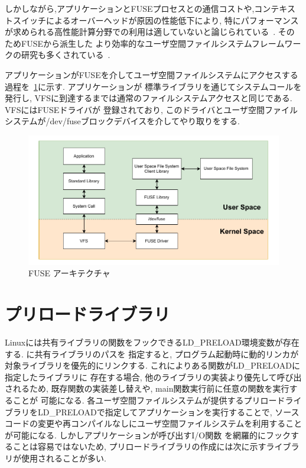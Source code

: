 \documentclass[a4paper,11pt]{jreport}
\begin{document}
しかしながら,アプリケーションとFUSEプロセスとの通信コストや,コンテキストスイッチによるオーバーヘッドが原因の性能低下により, 
特にパフォーマンスが求められる高性能計算分野での利用は適していないと論じられている~\cite{brinkmann2020ad}. そのためFUSEから派生した
より効率的なユーザ空間ファイルシステムフレームワークの研究も多くされている~\cite{294791, zhu2018direct}. 

アプリケーションがFUSEを介してユーザ空間ファイルシステムにアクセスする過程を\figurename~\ref{fig:FUSE}に示す. アプリケーションが
標準ライブラリを通じてシステムコールを発行し, VFSに到達するまでは通常のファイルシステムアクセスと同じである. VFSにはFUSEドライバが
登録されており, このドライバとユーザ空間ファイルシステムが/dev/fuseブロックデバイスを介してやり取りをする.


\newpage


\begin{figure}[h]
	\begin{minipage}[b]{1\columnwidth}
		\centering
		\includegraphics[width=0.9\linewidth]{./figure/FUSE.pdf}
		\caption{FUSE アーキテクチャ}
		\label{fig:FUSE}
	\end{minipage}
\end{figure}

\newpage


\section{プリロードライブラリ}
Linuxには共有ライブラリの関数をフックできるLD\_PRELOAD環境変数が存在する. に共有ライブラリのパスを
指定すると, プログラム起動時に動的リンカが対象ライブラリを優先的にリンクする. これによりある関数がLD\_PRELOADに指定したライブラリに
存在する場合, 他のライブラリの実装より優先して呼び出されるため, 既存関数の実装差し替えや, main関数実行前に任意の関数を実行することが
可能になる. 各ユーザ空間ファイルシステムが提供するプリロードライブラリをLD\_PRELOADで指定してアプリケーションを実行することで, 
ソースコードの変更や再コンパイルなしにユーザ空間ファイルシステムを利用することが可能になる. しかしアプリケーションが呼び出すI/O関数
を網羅的にフックすることは容易ではないため, プリロードライブラリの作成には次に示すライブラリが使用されることが多い. 
\end{document}
